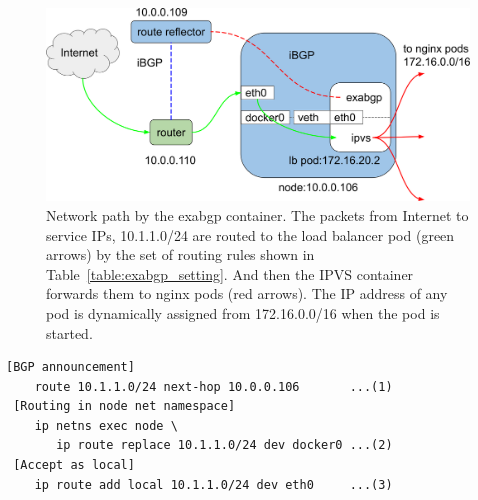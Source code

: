 \begin{figure}[tb]
  \centering
  \includegraphics[width=0.9\columnwidth]{Figs/exabgp}
  
  \par\bigskip
  \centering
  \begin{minipage}{0.9\columnwidth}
    \caption[Network path by the exabgp container]{
      Network path by the exabgp container.
      The packets from Internet to service IPs, 10.1.1.0/24 are routed to the load balancer pod (green arrows) by the set of routing rules shown in Table~\ref{table:exabgp_setting}.
      And then the IPVS container forwards them to nginx pods (red arrows).
      The IP address of any pod is dynamically assigned from 172.16.0.0/16 when the pod is started. 
    }
    \label{fig:exabgp_schem}
  \end{minipage}

\end{figure}

\begin{table}

  \centering
  \begin{minipage}{0.85\columnwidth}
    \begin{lstlisting}[frame=lines,breaklines=true,basicstyle=\small\ttfamily]
 [BGP announcement]
    route 10.1.1.0/24 next-hop 10.0.0.106       ...(1)
 [Routing in node net namespace]
    ip netns exec node \
       ip route replace 10.1.1.0/24 dev docker0 ...(2)
 [Accept as local]
    ip route add local 10.1.1.0/24 dev eth0     ...(3)
    \end{lstlisting}
  \end{minipage}

  \par\bigskip
  \centering
  \begin{minipage}{0.9\columnwidth}
    \caption[Required settings in the exabgp container]{
      Required settings in the exabgp container.
      (1) The node IP address, 10.0.0.106 is used as next-hop for the service IPs, 10.1.1.0/24, in BGP announcement.
      (2) In order to route the packets destined toward the service IP to the container, a routing rule to the dev docker0 is created in the node net namespace. 
      (3) A routing rule to accept the packets destined toward the service IPs,  as local is also required.
    }
    \label{table:exabgp_setting}
  \end{minipage}

\end{table}


